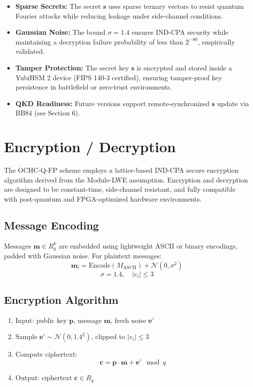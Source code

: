 \documentclass[12pt]{article}
\begin{document}
\begin{itemize}
    \item \textbf{Sparse Secrets:} The secret \( \mathbf{s} \) uses sparse ternary vectors to resist quantum Fourier attacks while reducing leakage under side-channel conditions.
    \item \textbf{Gaussian Noise:} The bound \( \sigma = 1.4 \) ensures IND-CPA security while maintaining a decryption failure probability of less than \( 2^{-80} \), empirically validated.
    \item \textbf{Tamper Protection:} The secret key \( \mathbf{s} \) is encrypted and stored inside a YubiHSM 2 device (FIPS 140-3 certified), ensuring tamper-proof key persistence in battlefield or zero-trust environments.
    \item \textbf{QKD Readiness:} Future versions support remote-synchronized \( \mathbf{s} \) update via BB84 (see Section 6).
\end{itemize}
\section*{Encryption / Decryption}

The OCHC-Q-FP scheme employs a lattice-based IND-CPA secure encryption algorithm derived from the Module-LWE assumption. Encryption and decryption are designed to be constant-time, side-channel resistant, and fully compatible with post-quantum and FPGA-optimized hardware environments.

\subsection*{Message Encoding}

Messages \( \mathbf{m} \in R_q^k \) are embedded using lightweight ASCII or binary encodings, padded with Gaussian noise. For plaintext messages:
\[
\mathbf{m}_i = \text{Encode}(M_{\text{ASCII}}) + \mathcal{N}(0, \sigma^2)
\]
\[
\sigma = 1.4, \quad |e_i| \leq 3
\]

\subsection*{Encryption Algorithm}

\begin{enumerate}
    \item Input: public key \( \mathbf{p} \), message \( \mathbf{m} \), fresh noise \( \mathbf{e}' \)
    \item Sample \( \mathbf{e}' \sim \mathcal{N}(0, 1.4^2) \), clipped to \( |e_i| \leq 3 \)
    \item Compute ciphertext:
    \[
    \mathbf{c} = \mathbf{p} \cdot \mathbf{m} + \mathbf{e}' \mod q
    \]
    \item Output: ciphertext \( \mathbf{c} \in R_q \)
\end{enumerate}
\end{document}
